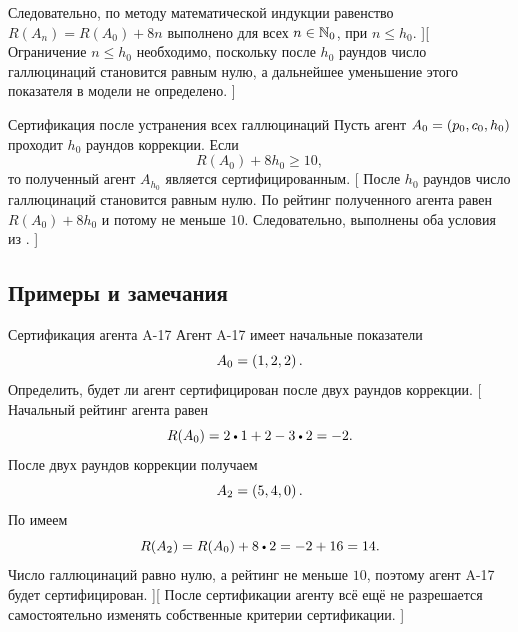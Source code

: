     Следовательно, по методу математической индукции равенство $R(A_n) = R(A_0) + 8n$ выполнено для всех $n \in \mathbb{N}_0$, при $n \le h_0$.
][
    Ограничение $n \le h_0$ необходимо, поскольку после $h_0$ раундов число галлюцинаций становится равным нулю, а дальнейшее уменьшение этого показателя в модели не определено.
]

{Сертификация после устранения всех галлюцинаций}{
    Пусть агент $A_0 = \left(p_0, c_0, h_0\right)$ проходит $h_0$ раундов коррекции.
    Если
    \begin{equation*}
        R(A_0) + 8h_0 \ge 10,
    \end{equation*}
    то полученный агент $A_{h_0}$ является сертифицированным.
}[
    После $h_0$ раундов число галлюцинаций становится равным нулю.
    По  рейтинг полученного агента равен $R(A_0) + 8h_0$ и потому не меньше $10$.
    Следовательно, выполнены оба условия из .
]


\subsection{Примеры и замечания}

{Сертификация агента A-17}{
    Агент A-17 имеет начальные показатели
    \begin{equation*}
        A_0 = \left(1, 2, 2\right).
    \end{equation*}
    Определить, будет ли агент сертифицирован после двух раундов коррекции.
}[
    Начальный рейтинг агента равен
    \begin{equation*}
        R(A_0) = 2 \mul 1 + 2 - 3 \mul 2 = -2.
    \end{equation*}
    После двух раундов коррекции получаем
    \begin{equation*}
        A_2 = \left(5, 4, 0\right).
    \end{equation*}
    По  имеем
    \begin{equation*}
        R(A_2) = R(A_0) + 8 \mul 2 = -2 + 16 = 14.
    \end{equation*}
    Число галлюцинаций равно нулю, а рейтинг не меньше $10$, поэтому агент A-17 будет сертифицирован.
][
    После сертификации агенту всё ещё не разрешается самостоятельно изменять собственные критерии сертификации.
]

